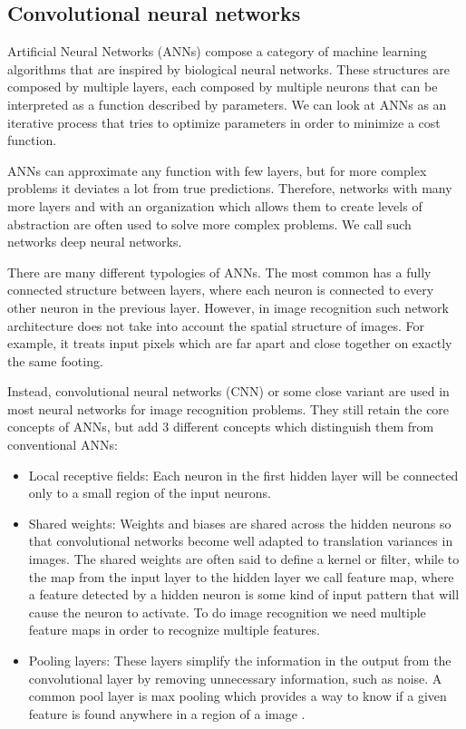 \subsection{Convolutional neural networks}
Artificial Neural Networks (ANNs) compose a category of machine learning algorithms that are inspired by biological neural networks. These structures are composed by multiple layers, each composed by multiple neurons that can be interpreted as a function described by parameters. We can look at ANNs as an iterative process that tries to optimize parameters in order to minimize a cost function. \par
ANNs can approximate any function with few layers, but for more complex problems it deviates a lot from true predictions. Therefore, networks with many more layers and with an organization which allows them to create levels of abstraction are often used to solve more complex problems. We call such networks deep neural networks. \par
There are many different typologies of ANNs. The most common has a fully connected structure between layers, where each neuron is connected to every other neuron in the previous layer. However, in image recognition such network architecture does not take into account the spatial structure of images. For example, it treats input pixels which are far apart and close together on exactly the same footing. \par
Instead, convolutional neural networks (CNN) or some close variant are used in most neural networks for image recognition problems\cite{Nielsen2017a}. They still retain the core concepts of ANNs, but add 3 different concepts which distinguish them from conventional ANNs:
\begin{itemize}
\item Local receptive fields: Each neuron in the first hidden layer will be connected only to a small region of the input neurons.
\item Shared weights: Weights and biases are shared across the hidden neurons so that convolutional networks become well adapted to translation variances in images. The shared weights are often said to define a kernel or filter, while to the map from the input layer to the hidden layer we call feature map, where a feature detected by a hidden neuron is some kind of input pattern that will cause the neuron to activate. To do image recognition we need multiple feature maps in order to recognize multiple features.
\item Pooling layers: These layers simplify the information in the output from the convolutional layer by removing unnecessary information, such as noise. A common pool layer is max pooling which provides a way to know if a given feature is found anywhere in a region of a image \cite{Nielsen2017a}.
\end{itemize}
